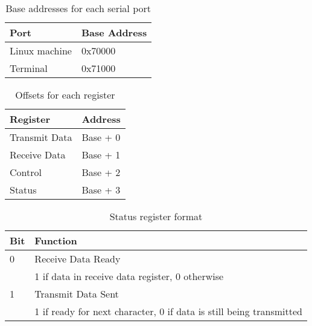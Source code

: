 \documentclass[a4paper,10pt]{article}
\begin{document}
\begin{table}[h]
\begin{center}
\begin{tabular}{|l|l|}
\hline
\textbf{Port} & \textbf{Base Address} \\
\hline
Linux machine & 0x70000 \\ 
\hline
Terminal & 0x71000 \\
\hline
\end{tabular}
\end{center}
\caption{Base addresses for each serial port}
\label{table:serialbase}
\end{table}

\begin{table}[h]
\begin{center}
\begin{tabular}{|l|l|}
\hline
\textbf{Register} & \textbf{Address} \\
\hline
Transmit Data & Base + 0 \\ 
\hline
Receive Data & Base + 1 \\
\hline
Control & Base + 2 \\
\hline
Status & Base + 3 \\
\hline
\end{tabular}
\end{center}
\caption{Offsets for each register}
\label{table:serialoffset}
\end{table}

\begin{table}[h]
\begin{center}
\begin{tabular}{|l|l|}
\hline
\textbf{Bit} & \textbf{Function} \\
\hline
0 & Receive Data Ready \\
 & 1 if data in receive data register, 0 otherwise \\
\hline
1 & Transmit Data Sent \\
 & 1 if ready for next character, 0 if data is still being transmitted  \\
\hline
\end{tabular}
\end{center}
\caption{Status register format}
\label{table:serialstat}
\end{table}




\newcommand{\subscrsm}[1]{\raisebox{-0.5ex}{\tiny #1}}  %
\newcommand{\regdsm}{R\subscrsm{d}}
\newcommand{\regssm}{R\subscrsm{s}}
\newcommand{\regtsm}{R\subscrsm{t}}
\end{document}
